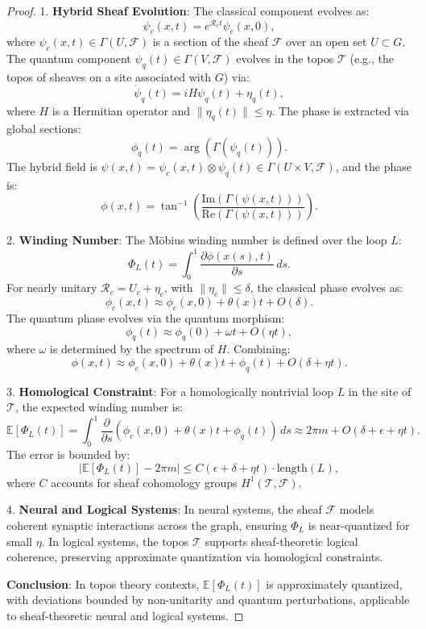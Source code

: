 \documentclass[12pt]{article}
\begin{document}
\begin{proof}

1. \textbf{Hybrid Sheaf Evolution}:
   The classical component evolves as:
   \[
   \psi_c(x,t) = e^{\mathcal{R}_c t} \psi_c(x,0),
   \]
   where \(\psi_c(x,t) \in \Gamma(U, \mathcal{F})\) is a section of the sheaf \(\mathcal{F}\) over an open set \(U \subset G\). The quantum component \(\psi_q(t) \in \Gamma(V, \mathcal{F})\) evolves in the topos \(\mathcal{T}\) (e.g., the topos of sheaves on a site associated with \(G\)) via:
   \[
   \dot{\psi}_q(t) = i H \psi_q(t) + \eta_q(t),
   \]
   where \(H\) is a Hermitian operator and \(\|\eta_q(t)\| \leq \eta\). The phase is extracted via global sections:
   \[
   \phi_q(t) = \arg(\Gamma(\psi_q(t))).
   \]
   The hybrid field is \(\psi(x,t) = \psi_c(x,t) \otimes \psi_q(t) \in \Gamma(U \times V, \mathcal{F})\), and the phase is:
   \[
   \phi(x,t) = \tan^{-1}\left( \frac{\text{Im}(\Gamma(\psi(x,t)))}{\text{Re}(\Gamma(\psi(x,t)))} \right).
   \]

2. \textbf{Winding Number}:
   The Möbius winding number is defined over the loop \(L\):
   \[
   \Phi_L(t) = \int_0^1 \frac{\partial \phi(x(s),t)}{\partial s} \, ds.
   \]
   For nearly unitary \(\mathcal{R}_c = U_c + \eta_c\), with \(\|\eta_c\| \leq \delta\), the classical phase evolves as:
   \[
   \phi_c(x,t) \approx \phi_c(x,0) + \theta(x)t + O(\delta).
   \]
   The quantum phase evolves via the quantum morphism:
   \[
   \phi_q(t) \approx \phi_q(0) + \omega t + O(\eta t),
   \]
   where \(\omega\) is determined by the spectrum of \(H\). Combining:
   \[
   \phi(x,t) \approx \phi_c(x,0) + \theta(x)t + \phi_q(t) + O(\delta + \eta t).
   \]

3. \textbf{Homological Constraint}:
   For a homologically nontrivial loop \(L\) in the site of \(\mathcal{T}\), the expected winding number is:
   \[
   \mathbb{E}[\Phi_L(t)] = \int_0^1 \frac{\partial}{\partial s} \left( \phi_c(x,0) + \theta(x)t + \phi_q(t) \right) \, ds \approx 2\pi m + O(\delta + \epsilon + \eta t).
   \]
   The error is bounded by:
   \[
   \left| \mathbb{E}[\Phi_L(t)] - 2\pi m \right| \leq C (\epsilon + \delta + \eta t) \cdot \text{length}(L),
   \]
   where \(C\) accounts for sheaf cohomology groups \(H^1(\mathcal{T}, \mathcal{F})\).

4. \textbf{Neural and Logical Systems}:
   In neural systems, the sheaf \(\mathcal{F}\) models coherent synaptic interactions across the graph, ensuring \(\Phi_L\) is near-quantized for small \(\eta\). In logical systems, the topos \(\mathcal{T}\) supports sheaf-theoretic logical coherence, preserving approximate quantization via homological constraints.

\textbf{Conclusion}: In topos theory contexts, \(\mathbb{E}[\Phi_L(t)]\) is approximately quantized, with deviations bounded by non-unitarity and quantum perturbations, applicable to sheaf-theoretic neural and logical systems.

\end{proof}
\end{document}
